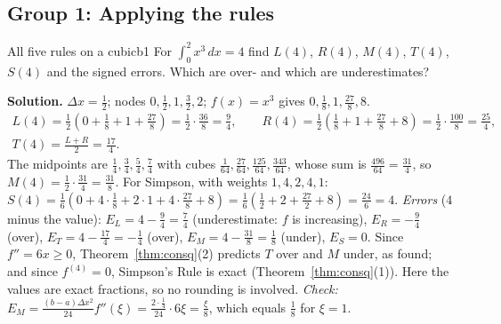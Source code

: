 \documentclass[11pt]{article}
\begin{document}
\subsection*{Group 1: Applying the rules}

\begin{exmp}{All five rules on a cubic}{b1}
For $\int_0^2x^3\,dx=4$ find $L(4)$, $R(4)$, $M(4)$, $T(4)$, $S(4)$ and the signed errors. Which are over- and which are underestimates?

\textbf{Solution.} $\Delta x=\frac12$; nodes $0,\frac12,1,\frac32,2$; $f(x)=x^3$ gives $0,\frac18,1,\frac{27}8,8$.
\[\begin{gathered}L(4)=\frac12\left(0+\frac18+1+\frac{27}8\right)=\frac12\cdot\frac{36}8=\frac94,\qquad R(4)=\frac12\left(\frac18+1+\frac{27}8+8\right)=\frac12\cdot\frac{100}8=\frac{25}4,\\T(4)=\frac{L+R}2=\frac{17}4 .\end{gathered}\]
The midpoints are $\frac14,\frac34,\frac54,\frac74$ with cubes $\frac1{64},\frac{27}{64},\frac{125}{64},\frac{343}{64}$, whose sum is $\frac{496}{64}=\frac{31}4$, so $M(4)=\frac12\cdot\frac{31}4=\frac{31}8$. For Simpson, with weights $1,4,2,4,1$: $S(4)=\frac16\left(0+4\cdot\frac18+2\cdot1+4\cdot\frac{27}8+8\right)=\frac16\left(\frac12+2+\frac{27}2+8\right)=\frac{24}6=4$.
\emph{Errors} ($4$ minus the value): $E_L=4-\frac94=\frac74$ (underestimate: $f$ is increasing), $E_R=-\frac94$ (over), $E_T=4-\frac{17}4=-\frac14$ (over), $E_M=4-\frac{31}8=\frac18$ (under), $E_S=0$. Since $f''=6x\ge0$, Theorem~\ref{thm:consq}(2) predicts $T$ over and $M$ under, as found; and since $f^{(4)}=0$, Simpson's Rule is exact (Theorem~\ref{thm:consq}(1)). Here the values are exact fractions, so no rounding is involved. \emph{Check:} $E_M=\frac{(b-a)\Delta x^2}{24}f''(\xi)=\frac{2\cdot\frac14}{24}\cdot6\xi=\frac{\xi}{8}$, which equals $\frac18$ for $\xi=1$.
\end{exmp}
\end{document}
